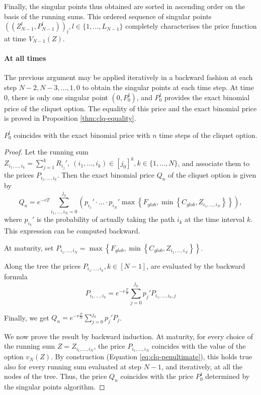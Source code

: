 Finally, the singular points thus obtained are sorted in ascending order on the basis of the running sums. This ordered sequence of singular points $ ( ( Z_{N-1}^l, P_{N-1}^l ) )_l , l \in \{ 1, \dots, L_{N-1} \} $ completely characterises the price function at time $ V_{N-1}(Z) $.


\paragraph{At all times}
The previous argument may be applied iteratively in a backward fashion at each step $ N-2, N-3, \dots, 1, 0 $ to obtain the singular points at each time step. At time 0, there is only one singular point $ (0, P_0^1) $, and $ P_0^1 $ provides the exact binomial price of the cliquet option. The equality of this price and the exact binomial price is proved in Proposition \ref{thm:clq-equality}.


\begin{prp}
	\label{thm:clq-equality}
	$ P_0^l $ coincides with the exact binomial price with $ n $ time steps of the cliquet option.
\end{prp}

\begin{proof}
	Let the running sum $ Z_{i_1, \dots, i_k} = \sum_{j=1}^{k} R_{i_j}', \  (i_1, \dots, i_k) \in [j_0]^k, k \in \{ 1, \dots, N \} $, and associate them to the prices $ P_{i_1, \dots, i_k} $.
	Then the exact binomial price $ Q_n $ of the cliquet option is given by
	\begin{equation*}
		Q_n = e^{-rT} \sum_{i_1, \dots, i_N = 0}^{j_0} \left( p_{i_1}' \cdot \dots \cdot p_{i_N}' \max \left\{ F_{glob}, \min \left\{ C_{glob}, Z_{i_1, \dots, i_N} \right\} \right\} \right) ,
	\end{equation*}
	where $ p_{i_k}' $ is the probability of actually taking the path $ i_k $ at the time interval $ k $. This expression can be computed backward.
	
	At maturity, set $ P_{i_1, \dots, i_N} = \max \left\{ F_{glob}, \min \left\{ C_{glob}, Z_{i_1, \dots, i_N} \right\} \right\} $.
	
	Along the tree the prices $ P_{i_1, \dots, i_k}, k \in [N-1] $, are evaluated by the
	backward formula
	\begin{equation*}
		P_{i_1, \dots, i_k}  =  e^{-r \frac{T}{N}}  \sum_{j=0}^{j_0} p_j' P_{i_1, \dots, i_k, j}
	\end{equation*}
	
	Finally, we get $ Q_n = e^{-r \frac{T}{N}}  \sum_{j=0}^{j_0} p_j' P_j $.
	
	We now prove the result by backward induction. At maturity, for every choice of the running sum $ Z = Z_{i_1, \dots, i_N} $, the price $ P_{i_1, \dots, i_N} $ coincides with the value of the option $ v_N(Z) $. By construction (Equation \ref{eq:clq-penultimate}), this holds true
	also for every running sum evaluated at step $ N - 1 $, and iteratively, at all the nodes
	of the tree. Thus, the price $ Q_n $ coincides with the price $ P_0^1 $ determined by the singular points algorithm.
\end{proof}


